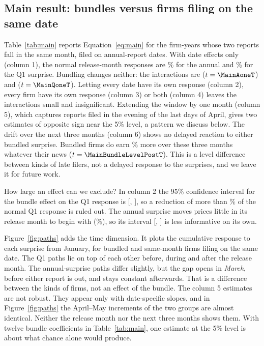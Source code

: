 \documentclass[11pt]{article}
\begin{document}
\subsection{Main result: bundles versus firms filing on the same date}

Table~\ref{tab:main} reports Equation~\eqref{eq:main} for the \MainN{} firm-years whose two reports fall in the same
month, filed on \MainNdates{} annual-report dates. With date effects only (column 1), the normal release-month
responses are \MainBaseA\% for the annual and \MainBaseQ\% for the Q1 surprise. Bundling changes neither: the
interactions are \MainAoneD{} ($t=\MainAoneT$) and \MainQoneD{} ($t=\MainQoneT$). Letting every date have its own
response (column 2), every firm have its own response (column 3) or both (column 4) leaves the interactions small and
insignificant. Extending the window by one month (column 5), which captures reports filed in the evening of the last
days of April, gives two estimates of opposite sign near the 5\% level, a pattern we discuss below. The drift over the next
three months (column 6) shows no delayed reaction to either bundled surprise. Bundled firms do earn
\MainBundleLevelPost\% more over these three months whatever their news ($t=\MainBundleLevelPostT$). This is a level
difference between kinds of late filers, not a delayed response to the surprises, and we leave it for future work.

How large an effect can we exclude? In column 2 the 95\% confidence interval for the bundle effect on the Q1 response
is [\MainCIQlo, \MainCIQhi], so a reduction of more than \MainRuleOutQ\% of the normal Q1 response is ruled out. The
annual surprise moves prices little in its release month to begin with (\MainBaseA\%), so its interval
[\MainCIAlo, \MainCIAhi] is less informative on its own.

Figure~\ref{fig:paths} adds the time dimension. It plots the cumulative response to each surprise from January, for
bundled and same-month firms filing on the same date. The Q1 paths lie on top of each other before, during and after
the release month. The annual-surprise paths differ slightly, but the gap opens in \emph{March}, before either report
is out, and stays constant afterwards. That is a difference between the kinds of firms, not an effect of the bundle.
The column 5 estimates are not robust. They appear only with date-specific slopes, and in Figure~\ref{fig:paths} the
April--May increments of the two groups are almost identical. Neither the release month nor the next three months
shows them. With twelve bundle coefficients in Table~\ref{tab:main}, one estimate at the 5\% level is about what
chance alone would produce.
\end{document}
